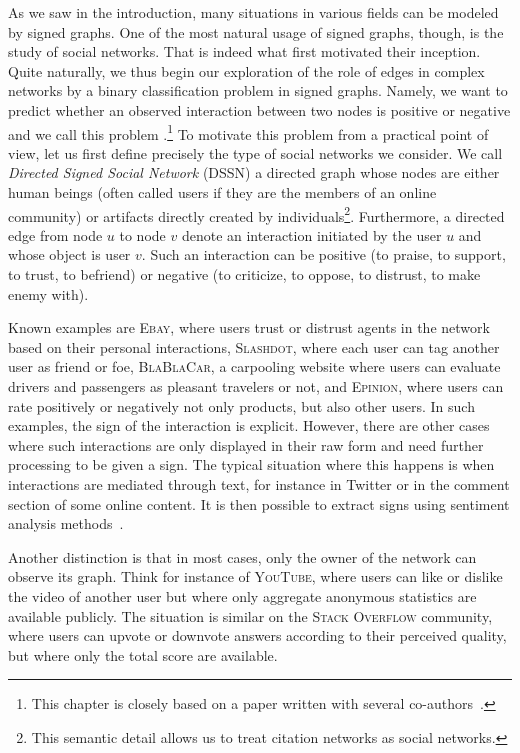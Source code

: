 As we saw in the introduction, many situations in various fields can be modeled by signed graphs.
One of the most natural usage of signed graphs, though, is the study of social networks. That is
indeed what first motivated their inception. Quite naturally, we thus begin our exploration of the
role of edges in complex networks by a binary classification problem in signed graphs. Namely, we
want to predict whether an observed interaction between two nodes is positive or negative and we
call this problem \esp{}.\footnote{This chapter is closely based on a paper written with several
co-authors~\autocite{trollSign17}.} To motivate this problem from a practical point of view, let us
first define precisely the type of social networks we consider. We call \emph{Directed Signed Social
Network} (DSSN) a directed graph whose nodes are either human beings (often called users if they are
the members of an online community) or artifacts directly created by individuals\footnote{This
semantic detail allows us to treat citation networks as social networks.}. Furthermore, a directed
edge from node $u$ to node $v$ denote an interaction initiated by the user $u$ and whose object is
user $v$. Such an interaction can be positive (to praise, to support, to trust, to befriend) or
negative (to criticize, to oppose, to distrust, to make enemy with).

Known examples are \textsc{Ebay}, where users trust or distrust agents in the network based on their
personal interactions, \textsc{Slashdot}, where each user can tag another user as friend or foe,
\textsc{BlaBlaCar}, a carpooling website where users can evaluate drivers and passengers as pleasant
travelers or not, and \textsc{Epinion}, where users can rate positively or negatively not only
products, but also other users. In such examples, the sign of the interaction is explicit. However,
there are other cases where such interactions are only displayed in their raw form and need further
processing to be given a sign. The typical situation where this happens is when interactions are
mediated through text, for instance in Twitter or in the comment section of some online content. It
is then possible to extract signs using sentiment analysis methods~\autocite{signedText12}.

Another distinction is that in most cases, only the owner of the network can observe its graph.
Think for instance of \textsc{YouTube}, where users can like or dislike the video of another user
but where only aggregate anonymous statistics are available publicly. The situation is similar on
the \textsc{Stack Overflow} community, where users can upvote or downvote answers according to their
perceived quality, but where only the total score are available.

